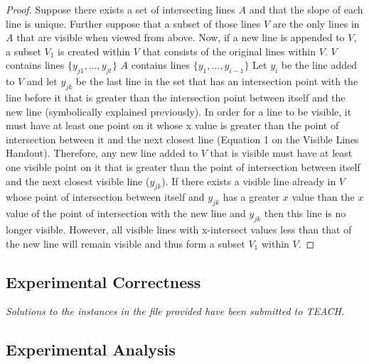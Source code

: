 \documentclass{article}
\begin{document}
\begin{proof}
Suppose there exists a set of intersecting lines $A$ and that the slope of each line is unique. Further suppose that a subset of those lines $V$ are the only lines in $A$ that are visible when viewed from above. Now, if a new line is appended to $V$, a subset $V_{1}$ is created within $V$ that consists of the original lines within $V$.\newline
$V$ contains lines $\{y_{j1},\ldots,y_{jt}\}$
\newline
$A$ contains lines $\{y_{1},\ldots,y_{i-1}\}$\newline
Let $y_{i}$ be the line added to $V$ and let $y_{jk}$ be the last line in the set that has an intersection point with the line before it that is greater than the intersection point between itself and the new line (symbolically explained previously).\newline
In order for a line to be visible, it must have at least one point on it whose x value is greater than the point of intersection between it and the next closest line (Equation 1 on the Visible Lines Handout). Therefore, any new line added to $V$ that is visible must have at least one visible point on it that is greater than the point of intersection between itself and the next closest visible line ($y_{jk}$). If there exists a visible line already in $V$ whose point of intersection between itself and $y_{jk}$ has a greater $x$ value than the $x$ value of the point of intersection with the new line and $y_{jk}$ then this line is no longer visible. However, all visible lines with x-intersect values less than that of the new line will remain visible and thus form a subset $V_{1}$ within $V$.
\end{proof}

\subsection*{Experimental Correctness}

\emph{Solutions to the instances in the file provided have been submitted to TEACH.}

\subsection*{Experimental Analysis}
\end{document}
